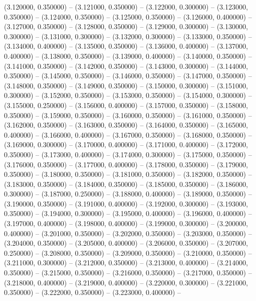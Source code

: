 (3.120000, 0.350000) -- 
(3.121000, 0.350000) -- 
(3.122000, 0.300000) -- 
(3.123000, 0.350000) -- 
(3.124000, 0.350000) -- 
(3.125000, 0.350000) -- 
(3.126000, 0.400000) -- 
(3.127000, 0.350000) -- 
(3.128000, 0.350000) -- 
(3.129000, 0.300000) -- 
(3.130000, 0.300000) -- 
(3.131000, 0.300000) -- 
(3.132000, 0.300000) -- 
(3.133000, 0.350000) -- 
(3.134000, 0.400000) -- 
(3.135000, 0.350000) -- 
(3.136000, 0.400000) -- 
(3.137000, 0.400000) -- 
(3.138000, 0.350000) -- 
(3.139000, 0.400000) -- 
(3.140000, 0.350000) -- 
(3.141000, 0.350000) -- 
(3.142000, 0.350000) -- 
(3.143000, 0.300000) -- 
(3.144000, 0.350000) -- 
(3.145000, 0.350000) -- 
(3.146000, 0.350000) -- 
(3.147000, 0.350000) -- 
(3.148000, 0.350000) -- 
(3.149000, 0.350000) -- 
(3.150000, 0.300000) -- 
(3.151000, 0.300000) -- 
(3.152000, 0.350000) -- 
(3.153000, 0.350000) -- 
(3.154000, 0.300000) -- 
(3.155000, 0.250000) -- 
(3.156000, 0.400000) -- 
(3.157000, 0.350000) -- 
(3.158000, 0.350000) -- 
(3.159000, 0.350000) -- 
(3.160000, 0.350000) -- 
(3.161000, 0.350000) -- 
(3.162000, 0.350000) -- 
(3.163000, 0.350000) -- 
(3.164000, 0.350000) -- 
(3.165000, 0.400000) -- 
(3.166000, 0.400000) -- 
(3.167000, 0.350000) -- 
(3.168000, 0.350000) -- 
(3.169000, 0.300000) -- 
(3.170000, 0.400000) -- 
(3.171000, 0.400000) -- 
(3.172000, 0.350000) -- 
(3.173000, 0.400000) -- 
(3.174000, 0.300000) -- 
(3.175000, 0.350000) -- 
(3.176000, 0.350000) -- 
(3.177000, 0.400000) -- 
(3.178000, 0.350000) -- 
(3.179000, 0.350000) -- 
(3.180000, 0.350000) -- 
(3.181000, 0.350000) -- 
(3.182000, 0.350000) -- 
(3.183000, 0.350000) -- 
(3.184000, 0.350000) -- 
(3.185000, 0.350000) -- 
(3.186000, 0.300000) -- 
(3.187000, 0.250000) -- 
(3.188000, 0.400000) -- 
(3.189000, 0.350000) -- 
(3.190000, 0.350000) -- 
(3.191000, 0.400000) -- 
(3.192000, 0.300000) -- 
(3.193000, 0.350000) -- 
(3.194000, 0.300000) -- 
(3.195000, 0.400000) -- 
(3.196000, 0.400000) -- 
(3.197000, 0.400000) -- 
(3.198000, 0.400000) -- 
(3.199000, 0.300000) -- 
(3.200000, 0.400000) -- 
(3.201000, 0.350000) -- 
(3.202000, 0.350000) -- 
(3.203000, 0.350000) -- 
(3.204000, 0.350000) -- 
(3.205000, 0.400000) -- 
(3.206000, 0.350000) -- 
(3.207000, 0.250000) -- 
(3.208000, 0.350000) -- 
(3.209000, 0.350000) -- 
(3.210000, 0.350000) -- 
(3.211000, 0.300000) -- 
(3.212000, 0.350000) -- 
(3.213000, 0.400000) -- 
(3.214000, 0.350000) -- 
(3.215000, 0.350000) -- 
(3.216000, 0.350000) -- 
(3.217000, 0.350000) -- 
(3.218000, 0.400000) -- 
(3.219000, 0.400000) -- 
(3.220000, 0.300000) -- 
(3.221000, 0.350000) -- 
(3.222000, 0.350000) -- 
(3.223000, 0.400000) -- 
